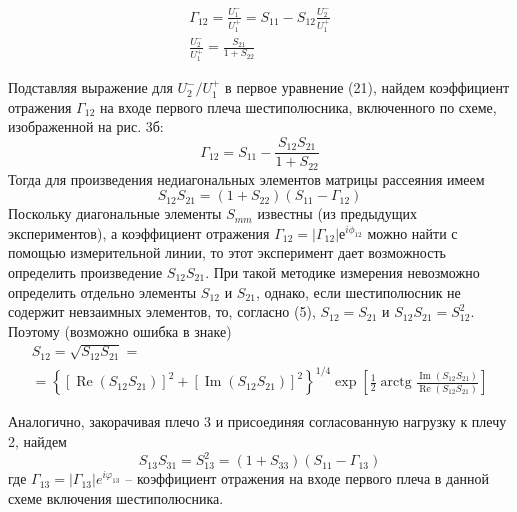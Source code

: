 \begin{gather}
{ \Gamma _ { 12 } = \frac { U _ { 1 } ^ { - } } { U _ { 1 } ^ { + } } = S _ { 11 } - S _ { 12 } 	\frac { U _ { 2 } ^ { - } } { U _ { 1 } ^ { + } } } 
\\ { \frac { U _ { 2 } ^ { - } } { U _ { 1 } ^ { + } } = \frac { S _ { 21 } } { 1 + S _ { 22 } } } 
\end{gather}

Подставляя выражение для $U_2^-/U_1^+$ в первое уравнение (21), найдем коэффициент отражения $\Gamma_{12}$ на входе первого плеча шестиполюсника, включенного по схеме, изображенной на рис. 3б:
\begin{equation}
	\Gamma _ { 12 } = S _ { 11 } - \frac { S _ { 12 } S _ { 21 } } { 1 + S _ { 22 } }
\end{equation}
Тогда для произведения недиагональных элементов матрицы рассеяния имеем
\begin{equation}
	S _ { 12 } S _ { 21 } = \left( 1 + S _ { 22 } \right) \left( S _ { 11 } - \Gamma _ { 12 } \right)
\end{equation}
Поскольку диагональные элементы $S_{mm}$ известны (из предыдущих экспериментов), а коэффициент отражения $\Gamma_{12}=|\Gamma_{12}|е^{i\phi_{12}}$ можно найти с помощью измерительной линии, то этот эксперимент дает возможность определить произведение $S_{12}S_{21}$.
При такой методике измерения невозможно определить отдельно элементы $S_{12}$ и $S_{21}$, однако, если шестиполюсник не содержит невзаимных элементов, то, согласно (5), $S_{12} = S_{21}$ и $S_{12}S_{21}=S_{12}^2$. 
Поэтому (возможно ошибка в знаке)
\begin{gather}
	S _ { 12 } = \sqrt { S _ { 12 } S _ { 21 } } = \nonumber \\= \left\{ \left[ \operatorname { Re } \left( S _ { 12 } S _ { 21 } \right) \right] ^ { 2 } + \left[ \operatorname { Im } \left( S _ { 12 } S _ { 21 } \right) \right] ^ { 2 } \right\} ^ { 1 / 4 } \exp \left[ \frac { 1 } { 2 } \operatorname { arctg } \frac { \operatorname { Im } \left( S _ { 12 } S _ { 21 } \right) } { \operatorname { Re } \left( S _ { 12 } S _ { 21 } \right) } \right]
\end{gather}

Аналогично, закорачивая плечо 3 и присоединяя согласованную нагрузку к плечу 2, найдем 
\begin{equation}
	S _ { 13 } S _ { 31 } = S _ { 13 } ^ { 2 } = \left( 1 + S _ { 33 } \right) \left( S _ { 11 } - \Gamma _ { 13 } \right)
\end{equation}
где  $\Gamma _ { 13 } = \left| \Gamma _ { 13 } \right| e ^ { i \varphi _ { 13 } }$ -- коэффициент отражения на входе первого плеча в данной схеме включения шестиполюсника.

